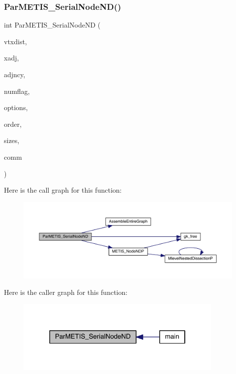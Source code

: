 \subsubsection{\texorpdfstring{Par\+M\+E\+T\+I\+S\+\_\+\+Serial\+Node\+N\+D()}{ParMETIS\_SerialNodeND()}}
{\footnotesize\ttfamily int Par\+M\+E\+T\+I\+S\+\_\+\+Serial\+Node\+ND (\begin{DoxyParamCaption}\item[{\hyperlink{a00876_aaa5262be3e700770163401acb0150f52}{idx\+\_\+t} $\ast$}]{vtxdist,  }\item[{\hyperlink{a00876_aaa5262be3e700770163401acb0150f52}{idx\+\_\+t} $\ast$}]{xadj,  }\item[{\hyperlink{a00876_aaa5262be3e700770163401acb0150f52}{idx\+\_\+t} $\ast$}]{adjncy,  }\item[{\hyperlink{a00876_aaa5262be3e700770163401acb0150f52}{idx\+\_\+t} $\ast$}]{numflag,  }\item[{\hyperlink{a00876_aaa5262be3e700770163401acb0150f52}{idx\+\_\+t} $\ast$}]{options,  }\item[{\hyperlink{a00876_aaa5262be3e700770163401acb0150f52}{idx\+\_\+t} $\ast$}]{order,  }\item[{\hyperlink{a00876_aaa5262be3e700770163401acb0150f52}{idx\+\_\+t} $\ast$}]{sizes,  }\item[{M\+P\+I\+\_\+\+Comm $\ast$}]{comm }\end{DoxyParamCaption})}

Here is the call graph for this function\+:\nopagebreak
\begin{figure}[H]
\begin{center}
\leavevmode
\includegraphics[width=350pt]{a00389_a5ea6a6f60f172d69aae0c4bace99a5ae_cgraph}
\end{center}
\end{figure}
Here is the caller graph for this function\+:\nopagebreak
\begin{figure}[H]
\begin{center}
\leavevmode
\includegraphics[width=286pt]{a00389_a5ea6a6f60f172d69aae0c4bace99a5ae_icgraph}
\end{center}
\end{figure}
